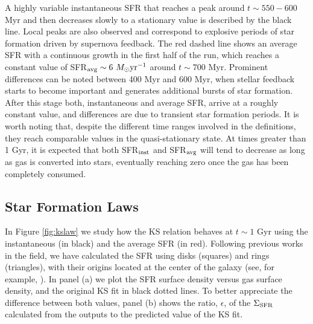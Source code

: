 \documentclass[twocolumn]{aastex}
\newcommand{\ssfr}{\Sigma_{\rm SFR}}
\newcommand{\msun}{M_\odot}
\begin{document}
A highly variable instantaneous SFR that reaches a peak around $t \sim 550 - 600$ Myr and then decreases slowly to a stationary value is described by the black line. Local peaks are also observed and correspond to explosive periods of star formation driven by supernova feedback. The red dashed line shows an average SFR with a continuous growth in the first half of the run, which reaches a constant value of SFR$_{\rm avg} \sim 6~\msun \text{yr}^{-1}$ around $t \sim 700$ Myr. Prominent differences can be noted between 400 Myr and 600 Myr, when stellar feedback starts to become important and generates additional bursts of star formation. After this stage both, instantaneous and average SFR, arrive at a roughly constant value, and differences are due to transient star formation periods. It is worth noting that, despite the different time ranges involved in the definitions, they reach comparable values in the quasi-stationary state. At times greater than 1 Gyr, it is expected that both SFR$_{\rm inst}$ and SFR$_{\rm avg}$ will tend to decrease as long as gas is converted into stars, eventually reaching zero once the gas has been completely consumed.

\subsection{Star Formation Laws}
\label{subsec:SFL}

In Figure \ref{fig:kslaw} we study how the KS relation behaves at $t \sim 1$ Gyr using the instantaneous (in black) and the average SFR (in red). Following previous works in the field, we have calculated the SFR using disks (squares) and rings (triangles), with their origins located at the center of the galaxy (see, for example, \citet{Tasker_Bryan_06}). In panel (a) we plot the SFR surface density versus gas surface density, and the original KS fit in black dotted lines. To better appreciate the difference between both values, panel (b) shows the ratio, $\epsilon$, of the $\ssfr$ calculated from the outputs to the predicted value of the KS fit.
\end{document}

